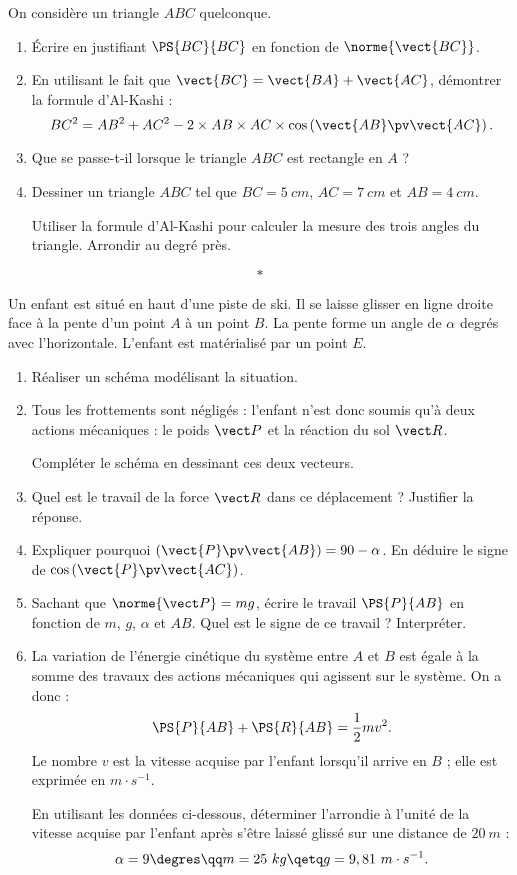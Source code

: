\documentclass[10pt,openright,twoside,french]{book}
\begin{document}
\exo On considère un triangle $ABC$ quelconque.
\begin{enumerate}
    \item \'Ecrire en justifiant $\PS{BC}{BC}$ en fonction de $\norme{\vect{BC}}$.
    \item En utilisant le fait que $\vect{BC} = \vect{BA} + \vect{AC}$, démontrer la formule d'Al-Kashi :
        \[BC^2 = AB^2 + AC^2 - 2 \times AB \times AC \times \cos\left(\vect{AB}\pv\vect{AC}\right).\]
    \item Que se passe-t-il lorsque le triangle $ABC$ est rectangle en $A$ ?
    \item Dessiner un triangle $ABC$ tel que $BC = 5~cm$, $AC = 7~cm$ et $AB = 4~cm$.\par
        Utiliser la formule d'Al-Kashi pour calculer la mesure des trois angles du triangle. Arrondir au degré près.
\end{enumerate}\[*\]

\exo Un enfant est situé en haut d'une piste de ski. Il se laisse glisser en ligne droite face à la pente d'un point $A$ à un point $B$. La pente forme un angle de $\alpha$ degrés avec l'horizontale. L'enfant est matérialisé par un point $E$.
\begin{enumerate}
    \item Réaliser un schéma modélisant la situation.
    \item Tous les frottements sont négligés : l'enfant n'est donc soumis qu'à deux actions mécaniques : le poids $\vect P$ et la réaction du sol $\vect R$.\par
        Compléter le schéma en dessinant ces deux vecteurs.
    \item Quel est le travail de la force $\vect R$ dans ce déplacement ? Justifier la réponse.
    \item Expliquer pourquoi $\left(\vect{P}\pv\vect{AB}\right) = 90 - \alpha$. En déduire le signe de $\cos\left(\vect{P}\pv\vect{AC}\right)$.
    \item Sachant que $\norme{\vect P} = mg$, écrire le travail $\PS{P}{AB}$ en fonction de $m$, $g$, $\alpha$ et $AB$. Quel est le signe de ce travail ? Interpréter.
    \item La variation de l'énergie cinétique du système entre $A$ et $B$ est égale à la somme des travaux des actions mécaniques qui agissent sur le système. On a donc :
        \[\PS{P}{AB} + \PS{R}{AB} = \dfrac 1 2 m v^2.\] Le nombre $v$ est la vitesse acquise par l'enfant lorsqu'il arrive en $B$ ; elle est exprimée en $m\cdot s^{-1}$.\par
        En utilisant les données ci-dessous, déterminer l'arrondie à l'unité de la vitesse acquise par l'enfant après s'être laissé glissé sur une distance de $20~m$ :
        \[\alpha = 9\degres \qq m = 25~kg \qetq g = 9,81~m\cdot s^{-1}.\]
\end{enumerate}
\end{document}
